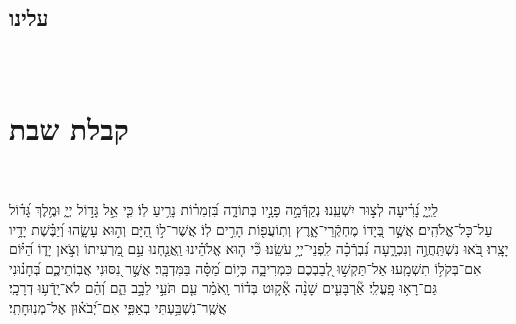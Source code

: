 \documentclass[twoside, openany, parskip=half, 11pt]{book}
\begin{document}

\tachanunim 
 
\pageref{chanukah}\\ %
\pageref{purim}

\fullkaddish

\pageref{sefiras haomer}

\section*{ עלינו }

\aleinu


\vfill

\quad{}\quad{}\\


\chapter[קבלת שבת]{ קבלת שבת }
\label{kabalas_shabbos}

\\


  
 לַֽיְיָ֑ נָ֝רִ֗יעָה לְצ֣וּר יִשְׁעֵֽנוּ׃ 
 נְקַדְּֿמָ֣ה פָנָ֣יו בְּתוֹדָ֑ה בִּ֝זְמִר֗וֹת נָרִ֥יעַ לֽוֹ׃ 
 כִּ֤י אֵ֣ל גָּד֣וֹל יְיָ֑ וּמֶ֥לֶךְ גָּ֝ד֗וֹל עַל־כָּל־אֱלֹהִֽים׃ 
 אֲשֶׁ֣ר בְּ֭יָדוֹ מֶחְקְֿרֵי־אָ֑רֶץ וְתֽוֹעֲפ֖וֹת הָרִ֣ים לֽוֹ׃ 
 אֲשֶׁר־ל֣וֹ הַ֭יָּם וְה֣וּא עָשָׂ֑הוּ וְ֝יַבֶּ֗שֶׁת יָדָ֥יו יָצָֽרוּ׃ 
 בֹּ֭אוּ נִשְׁתַּֽחֲוֶ֣ה וְנִכְרָ֑עָה נִ֝בְרְֿכָ֗ה לִֽפְנֵי־יְיָ֥ עֹשֵֽׂנוּ׃ 
 כִּ֘י ה֤וּא אֱלֹהֵ֗ינוּ וַֽאֲנַ֤חְנוּ עַ֣ם מַ֭רְעִיתוֹ וְצֹ֣אן יָד֑וֹ הַ֝יּ֗וֹם אִם־בְּקֹל֥וֹ תִשְׁמָֽעוּ׃ 
 אַל־תַּקְשׁ֣וּ לְ֭בַבְכֶם כִּמְרִיבָ֑ה כְּי֥וֹם מַ֝סָּ֗ה בַּמִּדְבָּֽר׃ 
 אֲשֶׁ֣ר נִ֭סּוּנִי אֲבֽוֹתֵיכֶ֑ם בְּ֝חָנ֗וּנִי גַּם־רָא֥וּ פָֽעֳלִֽי׃ 
 אַ֘רְבָּעִ֤ים שָׁנָ֨ה אָ֘ק֤וּט בְּד֗וֹר וָֽאֹמַ֗ר עַ֤ם תֹּעֵ֣י לֵבָ֣ב הֵ֑ם וְ֝הֵ֗ם לֹא־יָֽדְֿע֥וּ דְרָכָֽי׃ 
 אֲשֶֽׁר־נִשְׁבַּ֥עְתִּי בְאַפִּ֑י אִם־יְ֝בֹא֗וּן אֶל־מְנֽוּחָתִֽי׃
\end{document}
